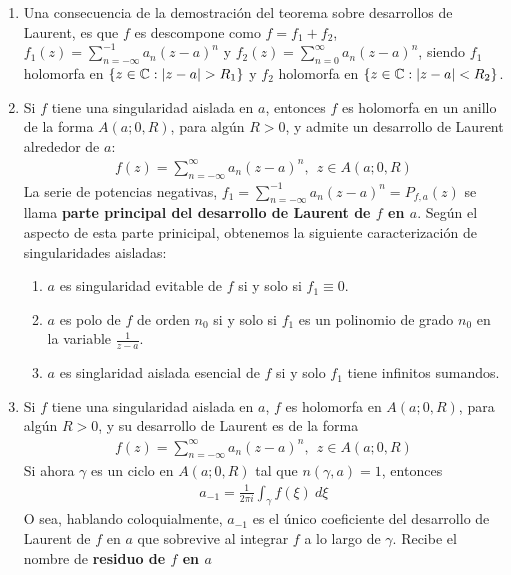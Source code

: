 \begin{obs}
    \begin{enumerate}
        \item Una consecuencia de la demostración del teorema sobre desarrollos de Laurent, es que $f$ es descompone como $f = f_1 + f_2$, $f_1(z) = \sum_{n=-\infty}^{-1}a_n(z-a)^n$ y $f_2(z) = \sum_{n=0}^{\infty} a_n (z-a)^n$, siendo $f_1$ holomorfa en $\{ z \in \mathbb{C} : |z-a| > R_1 \}$ y $f_2$ holomorfa en $\{ z \in \mathbb{C} : |z-a| < R_2 \}$.
        \item Si $f$ tiene una singularidad aislada en $a$, entonces $f$ es holomorfa en un anillo de la forma $A(a;0,R)$, para algún $R > 0$, y admite un desarrollo de Laurent alrededor de $a$:
              \begin{align*}
                  f(z) = \sum_{n=-\infty}^{\infty}{a_n(z-a)^n}, \ \ z \in A(a;0,R)
              \end{align*}
              La serie de potencias negativas, $f_1 = \sum_{n=-\infty}^{-1}a_n(z-a)^n = P_{f,a}(z)$ se llama \textbf{parte principal del desarrollo de Laurent de $f$ en $a$}. Según el aspecto de esta parte prinicipal, obtenemos la siguiente caracterización de singularidades aisladas:
              \begin{enumerate}
                  \item $a$ es singularidad evitable de $f$ si y solo si $f_1 \equiv 0$.
                  \item $a$ es polo de $f$ de orden $n_0$ si y solo si $f_1$ es un polinomio de grado $n_0$ en la variable $\frac{1}{z-a}$.
                  \item $a$ es singlaridad aislada esencial de $f$ si y solo $f_1$ tiene infinitos sumandos.
              \end{enumerate}
        \item Si $f$ tiene una singularidad aislada en $a$, $f$ es holomorfa en $A(a;0,R)$, para algún $R > 0$, y su desarrollo de Laurent es de la forma
              \begin{align*}
                  f(z) = \sum_{n=-\infty}^{\infty}{a_n(z-a)^n}, \ \ z \in A(a;0,R)
              \end{align*}
              Si ahora $\gamma$ es un ciclo en $A(a;0,R)$ tal que $n(\gamma,a) = 1$, entonces
              \begin{align*}
                  a_{-1} = \frac{1}{2\pi i} \int_{\gamma} f(\xi) \ d \xi
              \end{align*}
              O sea, hablando coloquialmente, $a_{-1}$ es el único coeficiente del desarrollo de Laurent de $f$ en $a$ que sobrevive al integrar $f$ a lo largo de $\gamma$. Recibe el nombre de \textbf{residuo de $f$ en $a$}

\end{enumerate}
\end{obs}
